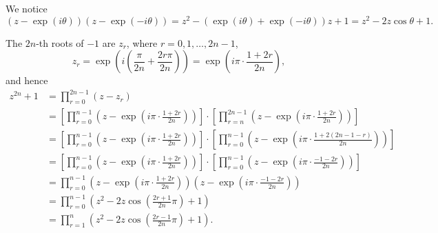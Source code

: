 \Question{\currfilebase}

We notice
\[
    (z - \exp(i\theta)) (z - \exp(-i\theta)) = z^2 - (\exp(i\theta) + \exp(-i\theta))z + 1 = z^2 - 2z \cos \theta + 1.
\]

The \(2n\)-th roots of \(-1\) are \(z_r\), where \(r = 0, 1, \ldots, 2n - 1\),
\[
    z_r = \exp\left(i\left(\frac{\pi}{2n} + \frac{2r\pi}{2n}\right)\right) = \exp\left(i\pi \cdot \frac{1 + 2r}{2n}\right),
\]
and hence
\begin{align*}
    z^{2n} + 1 & = \prod_{r = 0}^{2n - 1} (z - z_r)                                                                                                                                                                                     \\
               & = \left[\prod_{r = 0}^{n - 1} \left(z - \exp\left(i\pi \cdot \frac{1 + 2r}{2n}\right)\right)\right] \cdot \left[\prod_{r = n}^{2n - 1} \left(z - \exp\left(i\pi \cdot \frac{1 + 2r}{2n}\right)\right)\right]           \\
               & = \left[\prod_{r = 0}^{n - 1} \left(z - \exp\left(i\pi \cdot \frac{1 + 2r}{2n}\right)\right)\right] \cdot \left[\prod_{r = 0}^{n - 1} \left(z - \exp\left(i\pi \cdot \frac{1 + 2(2n - 1 - r)}{2n}\right)\right)\right] \\
               & = \left[\prod_{r = 0}^{n - 1} \left(z - \exp\left(i\pi \cdot \frac{1 + 2r}{2n}\right)\right)\right] \cdot \left[\prod_{r = 0}^{n - 1} \left(z - \exp\left(i\pi \cdot \frac{-1-2r}{2n}\right)\right)\right]             \\
               & = \prod_{r = 0}^{n - 1} \left(z - \exp\left(i\pi \cdot \frac{1 + 2r}{2n}\right)\right) \left(z - \exp\left(i\pi \cdot \frac{-1-2r}{2n}\right)\right)                                                                   \\
               & = \prod_{r = 0}^{n - 1} \left(z^2 - 2z \cos \left(\frac{2r + 1}{2n} \pi\right) + 1\right)                                                                                                                              \\
               & = \prod_{r = 1}^{n} \left(z^2 - 2z \cos \left(\frac{2r - 1}{2n} \pi\right) + 1\right).
\end{align*}

